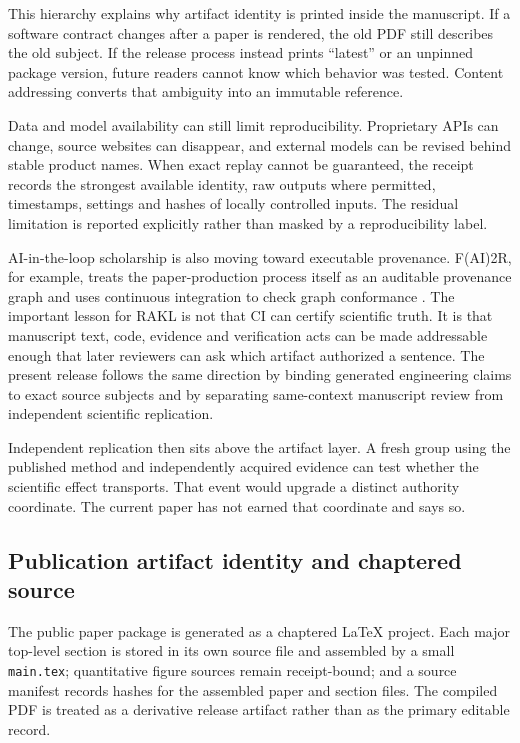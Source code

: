 This hierarchy explains why artifact identity is printed inside the manuscript. If a software contract changes after a paper is rendered, the old PDF still describes the old subject. If the release process instead prints ``latest'' or an unpinned package version, future readers cannot know which behavior was tested. Content addressing converts that ambiguity into an immutable reference.

Data and model availability can still limit reproducibility. Proprietary APIs can change, source websites can disappear, and external models can be revised behind stable product names. When exact replay cannot be guaranteed, the receipt records the strongest available identity, raw outputs where permitted, timestamps, settings and hashes of locally controlled inputs. The residual limitation is reported explicitly rather than masked by a reproducibility label.

AI-in-the-loop scholarship is also moving toward executable provenance. F(AI)2R, for example, treats the paper-production process itself as an auditable provenance graph and uses continuous integration to check graph conformance \cite{krebs2026fair}. The important lesson for RAKL is not that CI can certify scientific truth. It is that manuscript text, code, evidence and verification acts can be made addressable enough that later reviewers can ask which artifact authorized a sentence. The present release follows the same direction by binding generated engineering claims to exact source subjects and by separating same-context manuscript review from independent scientific replication.

Independent replication then sits above the artifact layer. A fresh group using the published method and independently acquired evidence can test whether the scientific effect transports. That event would upgrade a distinct authority coordinate. The current paper has not earned that coordinate and says so.

\subsection{Publication artifact identity and chaptered source}

The public paper package is generated as a chaptered \LaTeX{} project. Each major top-level section is stored in its own source file and assembled by a small \texttt{main.tex}; quantitative figure sources remain receipt-bound; and a source manifest records hashes for the assembled paper and section files. The compiled PDF is treated as a derivative release artifact rather than as the primary editable record.

